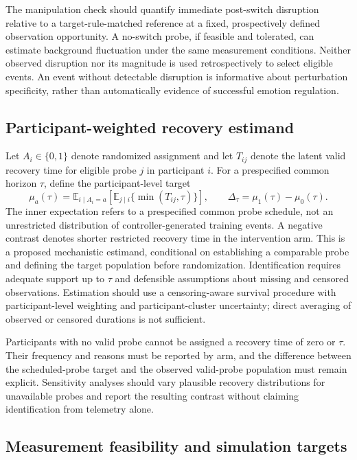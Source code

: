 The manipulation check should quantify immediate post-switch disruption relative to a target-rule-matched reference at a fixed, prospectively defined observation opportunity. A no-switch probe, if feasible and tolerated, can estimate background fluctuation under the same measurement conditions. Neither observed disruption nor its magnitude is used retrospectively to select eligible events. An event without detectable disruption is informative about perturbation specificity, rather than automatically evidence of successful emotion regulation.

\subsection{Participant-weighted recovery estimand}

Let \(A_i\in\{0,1\}\) denote randomized assignment and let \(T_{ij}\) denote the latent valid recovery time for eligible probe \(j\) in participant \(i\). For a prespecified common horizon \(\tau\), define the participant-level target
\[
\mu_a(\tau)=
\mathbb{E}_{i\mid A_i=a}
\left[
\mathbb{E}_{j\mid i}\{\min(T_{ij},\tau)\}
\right],
\qquad
\Delta_\tau=\mu_1(\tau)-\mu_0(\tau).
\]
The inner expectation refers to a prespecified common probe schedule, not an unrestricted distribution of controller-generated training events. A negative contrast denotes shorter restricted recovery time in the intervention arm. This is a proposed mechanistic estimand, conditional on establishing a comparable probe and defining the target population before randomization. Identification requires adequate support up to \(\tau\) and defensible assumptions about missing and censored observations. Estimation should use a censoring-aware survival procedure with participant-level weighting and participant-cluster uncertainty; direct averaging of observed or censored durations is not sufficient.

Participants with no valid probe cannot be assigned a recovery time of zero or \(\tau\). Their frequency and reasons must be reported by arm, and the difference between the scheduled-probe target and the observed valid-probe population must remain explicit. Sensitivity analyses should vary plausible recovery distributions for unavailable probes and report the resulting contrast without claiming identification from telemetry alone.

\subsection{Measurement feasibility and simulation targets}


